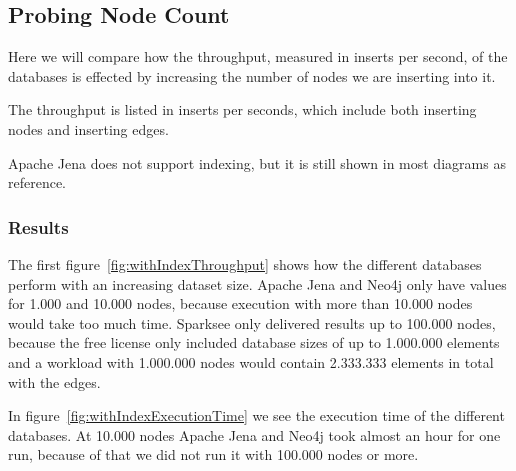 \subsection{Probing Node Count}
\label{ch:evaluation:se:probingNodeCount}
Here we will compare how the throughput, measured in inserts per second,
of the databases is effected by increasing the number of nodes we are inserting into it.

The throughput is listed in inserts per seconds,
which include both inserting nodes and inserting edges.

Apache Jena does not support indexing,
but it is still shown in most diagrams as reference.

\subsubsection{Results}
The first figure~\ref{fig:withIndexThroughput} shows how the different databases perform with an increasing dataset size.
Apache Jena and Neo4j only have values for 1.000 and 10.000 nodes,
because execution with more than 10.000 nodes would take too much time.
Sparksee only delivered results up to 100.000 nodes,
because the free license only included database sizes of up to 1.000.000 elements and a workload with 1.000.000 nodes would contain 2.333.333 elements in total with the edges.

In figure~\ref{fig:withIndexExecutionTime} we see the execution time of the different databases.
At 10.000 nodes Apache Jena and Neo4j took almost an hour for one run,
because of that we did not run it with 100.000 nodes or more.

